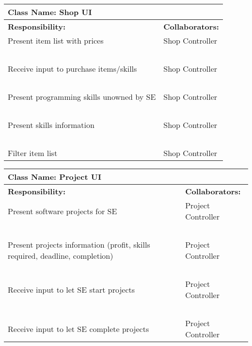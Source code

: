 \documentclass[]{article}
\begin{document}
\begin{table}[H]
    \centering
    \begin{tabular}{|p{7.5cm}|p{7.5cm}|}
        \hline
        \multicolumn{2}{|l|}{\textbf{Class Name:} Shop UI}\\
        \hline
        \textbf{Responsibility:} & \textbf{Collaborators:}\\
        \hline
        Present item list with prices & Shop Controller\\
        ~ & ~\\
        Receive input to purchase items/skills & Shop Controller\\
        ~ & ~\\
        Present programming skills unowned by SE & Shop Controller\\
        ~ & ~\\
        Present skills information & Shop Controller\\
        ~ & ~\\
        Filter item list & Shop Controller\\
        \hline
    \end{tabular}
\end{table}

\begin{table}[H]
    \centering
    \begin{tabular}{|p{7.5cm}|p{7.5cm}|}
        \hline
        \multicolumn{2}{|l|}{\textbf{Class Name:} Project UI}\\
        \hline
        \textbf{Responsibility:} & \textbf{Collaborators:}\\
        \hline
        Present software projects for SE & Project Controller\\
        ~ & ~\\
        Present projects information (profit, skills required, deadline, completion) & Project Controller\\
        ~ & ~\\
        Receive input to let SE start projects & Project Controller\\
        ~ & ~\\
        Receive input to let SE complete projects & Project Controller\\
        \hline
    \end{tabular}
\end{table}
\end{document}
